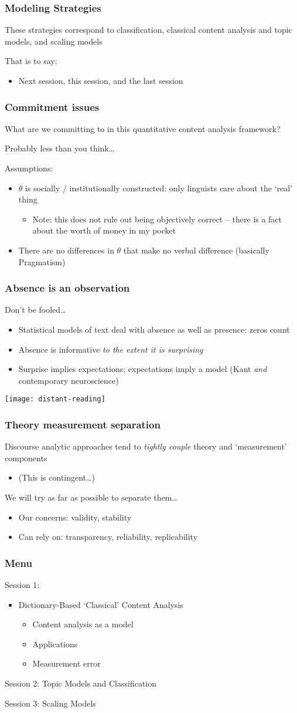\documentclass[11pt,compress,professionalfonts]{beamer}
\newcommand{\ita}{\begin{itemize}}
\newcommand{\itm}{\item[]}
\newcommand{\itz}{\end{itemize}}
\begin{document}
\begin{frame}[t,fragile]\frametitle{Modeling Strategies}

These strategies correspond to classification, classical content analysis and topic models, and scaling models

That is to say:
\ita
\itm Next session, this session, and the last session
\itz

\end{frame}
\begin{frame}[t,fragile]\frametitle{Commitment issues}

What are we committing to in this quantitative content analysis framework?

Probably less than you think\ldots

Assumptions:
\ita
\itm $\theta$ is socially / institutionally constructed: only linguists care about the `real' thing
\ita
\itm Note: this does not rule out being objectively correct -- there is a fact about the worth of money in my pocket
\itz
\itm There are no differences in $\theta$ that make no verbal difference (basically Pragmatism)
\itz

\end{frame}
\begin{frame}[t,fragile]\frametitle{Absence is an observation}

Don't be fooled\ldots
\ita
\itm Statistical models of text deal with absence as well as presence: zeros count
\itm Absence is informative \textit{to the extent it is surprising}
\itm Surprise implies expectations; expectations imply a model (Kant \textit{and} contemporary neuroscience)
\itz

\newpage

\centerline{\texttt{[image: distant-reading]}}

\end{frame}
\begin{frame}[t,fragile]\frametitle{Theory measurement separation}

Discourse analytic approaches tend to \textit{tightly couple} theory and `measurement' components
\ita
\itm (This is contingent\ldots)
\itz
We will try as far as possible to separate them\ldots
\ita
\itm Our concerns: validity, stability
\itm Can rely on: transparency, reliability, replicability
\itz



\end{frame}
\begin{frame}[t,fragile]\frametitle{Menu}

Session 1:
\ita
\itm Dictionary-Based `Classical' Content Analysis
\ita
\itm Content analysis as a model
\itm Applications
\itm Measurement error
\itz
\itz

Session 2: Topic Models and Classification

Session 3: Scaling Models

\end{frame}
\end{document}
